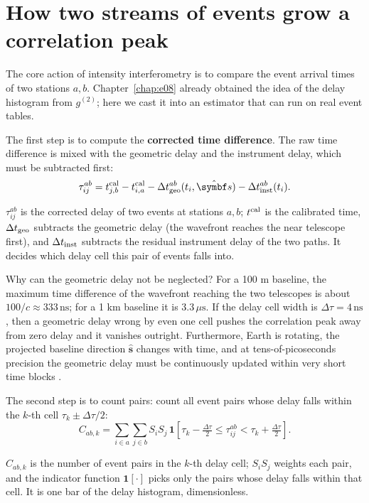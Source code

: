 \section{How two streams of events grow a correlation peak}
\label{sec:e14-corr}

The core action of intensity interferometry is to compare the event arrival times of two stations $a,b$. Chapter~\ref{chap:e08} already obtained the idea of the delay histogram from $g^{(2)}$; here we cast it into an estimator that can run on real event tables.

The first step is to compute the \textbf{corrected time difference}. The raw time difference is mixed with the geometric delay and the instrument delay, which must be subtracted first:
\begin{equation}
  \tau_{ij}^{ab}
  =
  t_{j,b}^{\rm cal}-t_{i,a}^{\rm cal}
  -\Delta t_{\rm geo}^{ab}(t_i,\hat{\bm s})
  -\Delta t_{\rm inst}^{ab}(t_i) .
  \label{eq:e14-delay}
\end{equation}
\begin{formulaexplain}
$\tau_{ij}^{ab}$ is the corrected delay of two events at stations $a,b$; $t^{\rm cal}$ is the calibrated time, $\Delta t_{\rm geo}$ subtracts the geometric delay (the wavefront reaches the near telescope first), and $\Delta t_{\rm inst}$ subtracts the residual instrument delay of the two paths. It decides which delay cell this pair of events falls into.
\end{formulaexplain}
Why can the geometric delay not be neglected? For a 100 m baseline, the maximum time difference of the wavefront reaching the two telescopes is about $100/c\approx333\,\mathrm{ns}$; for a 1 km baseline it is $3.3\,\mu\mathrm{s}$. If the delay cell width is $\Delta\tau=4\,\mathrm{ns}$, then a geometric delay wrong by even one cell pushes the correlation peak away from zero delay and it vanishes outright. Furthermore, Earth is rotating, the projected baseline direction $\hat{\bm s}$ changes with time, and at tens-of-picoseconds precision the geometric delay must be continuously updated within very short time blocks \citep{2006MNRAS.369..655H,2006MNRAS.372.1549E,2018RNAAS...2....4K,2020NatAs...4.1164A}.

The second step is to count pairs: count all event pairs whose delay falls within the $k$-th cell $\tau_k\pm\Delta\tau/2$:
\begin{equation}
  C_{ab,k}
  =\sum_{i\in a}\sum_{j\in b}
  S_iS_j\,
  \mathbf 1\!\left[\tau_k-\tfrac{\Delta\tau}{2}\le\tau_{ij}^{ab}<\tau_k+\tfrac{\Delta\tau}{2}\right] .
  \label{eq:e14-paircount}
\end{equation}
\begin{formulaexplain}
$C_{ab,k}$ is the number of event pairs in the $k$-th delay cell; $S_iS_j$ weights each pair, and the indicator function $\mathbf 1[\cdot]$ picks only the pairs whose delay falls within that cell. It is one bar of the delay histogram, dimensionless.
\end{formulaexplain}

